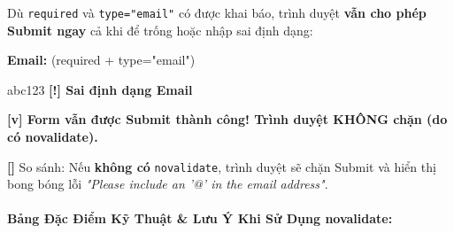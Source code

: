 \documentclass[11pt,oneside]{book}
\newcommand{\codeinline}[1]{\textcolor{accentOrange}{\texttt{#1}}}
\begin{document}
\begin{browserWindow}
\sffamily\small
Dù \codeinline{required} và \codeinline{type="email"} có được khai báo, trình duyệt \textbf{vẫn cho phép Submit ngay} cả khi để trống hoặc nhập sai định dạng:
\begin{tcolorbox}[colback=white, colframe=gray!30, arc=4pt, boxrule=0.8pt, left=12pt, right=12pt, top=10pt, bottom=10pt]
\textbf{\sffamily\small\textcolor{darkText}{Email:}} \hfill \textcolor{accentOrange}{\tiny (required + type="email")}\\[3pt]
\begin{tcolorbox}[colback=white, colframe=accentOrange!70, arc=3pt, boxrule=0.8pt, left=8pt, right=8pt, top=4pt, bottom=4pt]
\textcolor{darkText}{\sffamily\small abc123} \hfill \textcolor{accentOrange}{\tiny\bfseries [!] Sai định dạng Email}
\end{tcolorbox}
\vspace{6pt}
\begin{tcolorbox}[colback=tipBg, colframe=tipBorder, arc=3pt, boxrule=0.8pt, left=8pt, right=8pt, top=5pt, bottom=5pt]
\textcolor{tipBorder}{\sffamily\small\bfseries [v] Form vẫn được Submit thành công! Trình duyệt KHÔNG chặn (do có novalidate).}
\end{tcolorbox}
\end{tcolorbox}
\textcolor{primaryBlue}{\textbf{[\textrightarrow]}} So sánh: Nếu \textbf{không có} \codeinline{novalidate}, trình duyệt sẽ chặn Submit và hiển thị bong bóng lỗi \textit{"Please include an '@' in the email address"}.
\end{browserWindow}

\paragraph{Bảng Đặc Điểm Kỹ Thuật \& Lưu Ý Khi Sử Dụng novalidate:}
\end{document}
